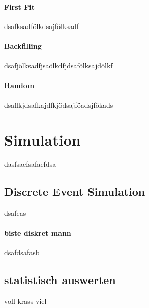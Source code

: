 \paragraph{First Fit}
dsafksadfölkdsajfölksadf

\paragraph{Backfilling}
dsafjölksadfjsaölkdfjdsafölksajdölkf

\paragraph{Random}
dsaflkjdsafkajdfkjödsajföadsjfökads




\section{Simulation}

dasfsaefsafaefdsa

\subsection{Discrete Event Simulation}

dsafeas

\paragraph{biste diskret mann}
dsafdsafasb

\subsection{statistisch auswerten}

voll krass viel
